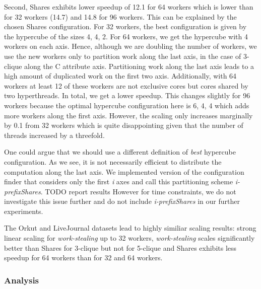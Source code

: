 Second, Shares exhibits lower speedup of 12.1 for 64 workers which is
lower than for 32 workers (14.7) and 14.8 for 96 workers.
This can be explained by the chosen Shares configuration.
For 32 workers, the best configuration is given by the hypercube of the sizes 4, 4, 2.
For 64 workers, we get the hypercube with 4 workers on each axis.
Hence, although we are doubling the number of workers, we use the new workers only to partition
work along the last axis, in the case of 3-clique along the C attribute axis.
Partitioning work along the last axis leads to a high amount of duplicated work on the first
two axis.
Additionally, with 64 workers at least 12 of these workers are not exclusive cores but cores shared by
two hyperthreads.
In total, we get a lower speedup.
This changes slightly for 96 workers because the optimal hypercube configuration here is 6, 4, 4 which
adds more workers along the first axis.
However, the scaling only increases marginally by 0.1 from 32 workers which is quite disappointing given
that the number of threads increased by a threefold.

One could argue that we should use a different definition of \textit{best} hypercube configuration.
As we see, it is not necessarily efficient to distribute the computation along the last axis.
We implemented version of the configuration finder that considers only the first \textit{i} axes and
call this partitioning scheme \textit{i-prefixShares}.
TODO report results
However for time constraints, we do not investigate this issue further and do not include \textit{i-prefixShares}
in our further experiments.



The Orkut and LiveJournal datasets lead to highly similiar scaling results:
strong linear scaling for \textit{work-stealing} up to 32 workers,
\textit{work-stealing} scales significantly better than Shares for 3-clique but
not for 5-clique and Shares exhibits less speedup for 64 workers than for 32 and 64 workers.











\subsubsection{Analysis}





